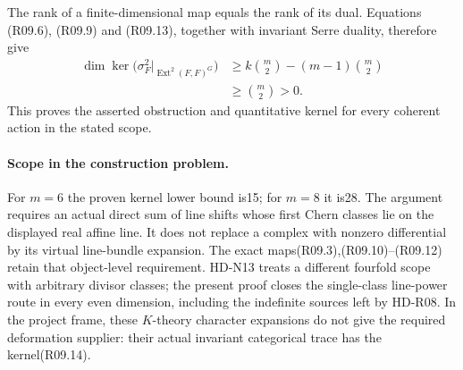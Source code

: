 The rank of a finite-dimensional map equals the rank of its
dual. Equations (R09.6), (R09.9) and (R09.13), together with
invariant Serre duality, therefore give
\[
 \begin{split}
 \dim\ker\bigl(\sigma_F^2|_{\operatorname{Ext}^2(F,F)^G}\bigr)
 &\ge k\binom m2-(m-1)\binom m2\\
 &\ge\binom m2>0.
 \end{split}                                                 \tag{R09.14}
\]
This proves the asserted obstruction and quantitative kernel
for every coherent action in the stated scope.

\paragraph{Scope in the construction problem.}
For $m=6$ the proven kernel lower bound is15; for $m=8$ it
is28. The argument requires an actual direct sum of line
shifts whose first Chern classes lie on the displayed real
affine line. It does not replace a complex with nonzero
differential by its virtual line-bundle expansion. The exact
maps(R09.3),(R09.10)--(R09.12) retain that object-level
requirement. HD-N13 treats a different fourfold scope with
arbitrary divisor classes; the present proof closes the
single-class line-power route in every even dimension,
including the indefinite sources left by HD-R08. In the
project frame, these $K$-theory character expansions do
not give the required deformation supplier: their actual
invariant categorical trace has the kernel(R09.14).

